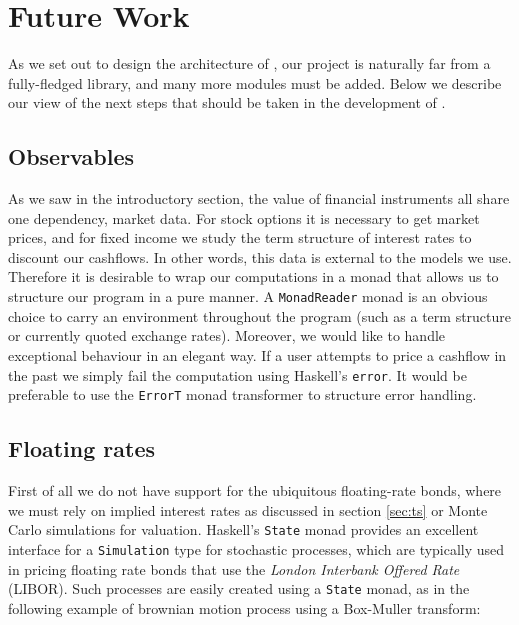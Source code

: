 \chapter{Future Work}

As we set out to design the architecture of \hql, our project is naturally far 
from a fully-fledged library, and many more modules must be added. Below we
describe our view of the next steps that should be taken in the development
of \hql.

\section{Observables}

As we saw in the introductory section, the value of financial instruments
all share one dependency, market data. For stock options it is necessary 
to get market prices, and for fixed income we study the term structure of
interest rates to discount our cashflows. In other words, this data is 
external to the models we use.\\

Therefore it is desirable to wrap our computations in a monad that allows us
to structure our program in a pure manner. A \texttt{MonadReader} monad is an obvious
choice to carry an environment throughout the program (such as a term structure or
currently quoted exchange rates). Moreover, we would like \hql to handle exceptional
behaviour in an elegant way. If a user attempts to price a cashflow in the past we 
simply fail the computation using Haskell's \texttt{error}. It would be preferable 
to use the \texttt{ErrorT} monad transformer to structure error handling.

\section{Floating rates}

First of all we do not have support for the ubiquitous floating-rate bonds, 
where we must rely on implied interest rates as discussed in section \ref{sec:ts}
or Monte Carlo simulations for valuation. Haskell's 
\texttt{State} monad provides an excellent interface for a \texttt{Simulation}
type for stochastic processes, which are typically used in pricing floating
rate bonds that use the \emph{London Interbank Offered Rate} (LIBOR). Such
processes are easily created using a \texttt{State} monad, as in the following
example of brownian motion process  using a  Box-Muller transform:

